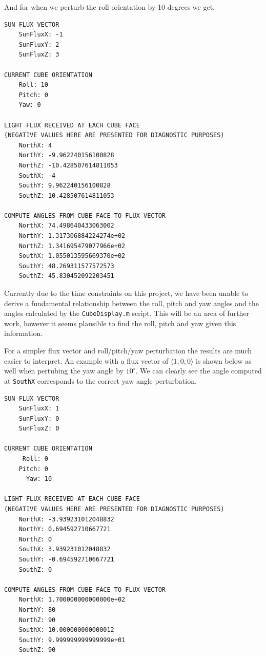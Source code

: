 \documentclass[10pt, letterpaper]{article}
\begin{document}
And for when we perturb the roll orientation by 10 degrees we get,

\begin{verbatim}
SUN FLUX VECTOR
    SunFluxX: -1
    SunFluxY: 2
    SunFluxZ: 3

CURRENT CUBE ORIENTATION
    Roll: 10
    Pitch: 0
    Yaw: 0

LIGHT FLUX RECEIVED AT EACH CUBE FACE
(NEGATIVE VALUES HERE ARE PRESENTED FOR DIAGNOSTIC PURPOSES)
    NorthX: 4
    NorthY: -9.962240156100828
    NorthZ: -10.428507614811053
    SouthX: -4
    SouthY: 9.962240156100828
    SouthZ: 10.428507614811053

COMPUTE ANGLES FROM CUBE FACE TO FLUX VECTOR
    NorthX: 74.498640433063002
    NorthY: 1.317306884224274e+02
    NorthZ: 1.341695479077966e+02
    SouthX: 1.055013595669370e+02
    SouthY: 48.269311577572573
    SouthZ: 45.830452092203451
\end{verbatim}

Currently due to the time constraints on this project, we have been unable to derive a fundamental relationship between the roll, pitch and yaw angles and the angles calculated by the \texttt{CubeDisplay.m} script. This will be an area of further work, however it seems plausible to find the roll, pitch and yaw given this information.

For a simpler flux vector and roll/pitch/yaw perturbation the results are much easier to interpret. An example with a flux vector of $\langle 1, 0, 0 \rangle$ is shown below as well when pertubing the yaw angle by $10^{\circ}$. We can clearly see the angle computed at \texttt{SouthX} corresponds to the correct yaw angle perturbation.

\begin{verbatim}
SUN FLUX VECTOR
    SunFluxX: 1
    SunFluxY: 0
    SunFluxZ: 0

CURRENT CUBE ORIENTATION
     Roll: 0
    Pitch: 0
      Yaw: 10

LIGHT FLUX RECEIVED AT EACH CUBE FACE
(NEGATIVE VALUES HERE ARE PRESENTED FOR DIAGNOSTIC PURPOSES)
    NorthX: -3.939231012048832
    NorthY: 0.694592710667721
    NorthZ: 0
    SouthX: 3.939231012048832
    SouthY: -0.694592710667721
    SouthZ: 0

COMPUTE ANGLES FROM CUBE FACE TO FLUX VECTOR
    NorthX: 1.700000000000000e+02
    NorthY: 80
    NorthZ: 90
    SouthX: 10.000000000000012
    SouthY: 9.999999999999999e+01
    SouthZ: 90
\end{verbatim}
\end{document}
